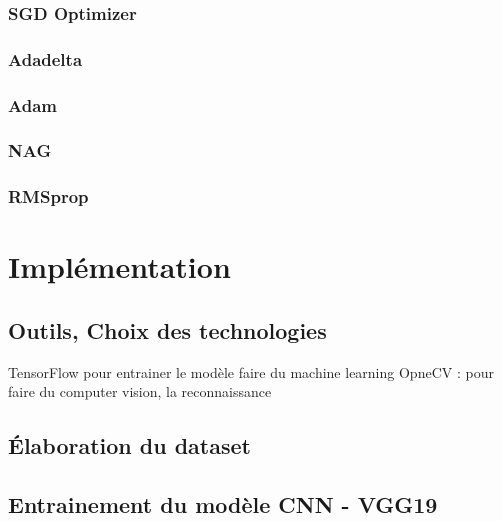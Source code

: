 	\subsubsection{SGD Optimizer}
	\lipsum[5]
	\subsubsection{Adadelta}
	\lipsum[2]
	\subsubsection{Adam}
	\lipsum[2]
	\subsubsection{NAG}
	\lipsum[4]
	\subsubsection{RMSprop}
	\lipsum[1]
	
	
	\section{Implémentation}
		\subsection{Outils, Choix des technologies}
		\lipsum[1]
		TensorFlow pour entrainer le modèle faire du machine learning
		OpneCV : pour faire du computer vision, la reconnaissance
		
		\subsection{Élaboration du dataset}
		
		\lipsum[1]
		
		\subsection{Entrainement du modèle CNN - VGG19}
		\lipsum[1]
	

